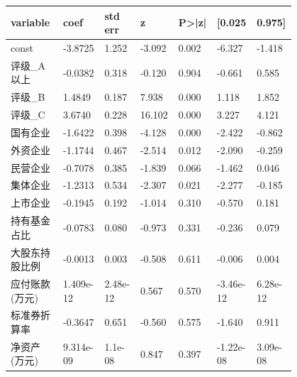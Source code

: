\begin{longtable}{p{0.18\linewidth}p{0.1\linewidth}p{0.1\linewidth}p{0.1\linewidth}p{0.1\linewidth}p{0.12\linewidth}p{0.1\linewidth}}
	\hline
	\textbf{variable} & \textbf{coef} & \textbf{std err} & \textbf{z} & \textbf{P>|z|} & \textbf{[0.025} & \textbf{0.975]} \\ \hline
	\hline
	const             & -3.8725       & 1.252            & -3.092     & 0.002          & -6.327          & -1.418          \\ \hline
	评级\_A以上       & -0.0382       & 0.318            & -0.120     & 0.904          & -0.661          & 0.585           \\ \hline
	评级\_B           & 1.4849        & 0.187            & 7.938      & 0.000          & 1.118           & 1.852           \\ \hline
	评级\_C           & 3.6740        & 0.228            & 16.102     & 0.000          & 3.227           & 4.121           \\ \hline
	国有企业          & -1.6422       & 0.398            & -4.128     & 0.000          & -2.422          & -0.862          \\ \hline
	外资企业          & -1.1744       & 0.467            & -2.514     & 0.012          & -2.090          & -0.259          \\ \hline
	民营企业          & -0.7078       & 0.385            & -1.839     & 0.066          & -1.462          & 0.046           \\ \hline
	集体企业          & -1.2313       & 0.534            & -2.307     & 0.021          & -2.277          & -0.185          \\ \hline
	上市企业          & -0.1945       & 0.192            & -1.014     & 0.310          & -0.570          & 0.181           \\ \hline
	持有基金占比      & -0.0783       & 0.080            & -0.973     & 0.331          & -0.236          & 0.079           \\ \hline
	大股东持股比例    & -0.0013       & 0.003            & -0.508     & 0.611          & -0.006          & 0.004           \\ \hline
	应付账款(万元)    & 1.409e-12     & 2.48e-12         & 0.567      & 0.570          & -3.46e-12       & 6.28e-12        \\ \hline
	标准券折算率      & -0.3647       & 0.651            & -0.560     & 0.575          & -1.640          & 0.911           \\ \hline
	净资产(万元)      & 9.314e-09     & 1.1e-08          & 0.847      & 0.397          & -1.22e-08       & 3.09e-08        \\ \hline

\end{longtable}
